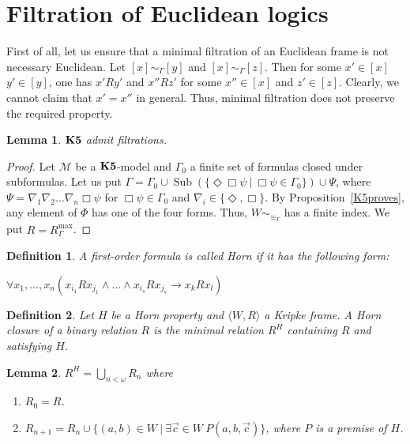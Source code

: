 \documentclass[a4paper]{article}
\theoremstyle{defin}
\newtheorem{defin}{Definition}
\theoremstyle{theorem}
\theoremstyle{prop}
\theoremstyle{lemma}
\newtheorem{lemma}{Lemma}
\theoremstyle{fact}
\theoremstyle{ex}
\theoremstyle{col}
\begin{document}
\section{Filtration of Euclidean logics}

First of all, let us ensure that a minimal filtration of an Euclidean frame is not necessary Euclidean.
Let $[x] \sim_{\Gamma} [y]$ and $[x] \sim_{\Gamma} [z]$. Then for some $x' \in [x]$ $y' \in [y]$, one has
$x' R y'$ and $x'' R z'$ for some $x'' \in [x]$ and $z' \in [z]$. Clearly, we cannot claim that $x' = x''$ in general. Thus, minimal filtration does not preserve the required property.

\begin{lemma}
  ${\bf K5}$ admit filtrations.
\end{lemma}

\begin{proof}
  Let $\mathcal{M}$ be a ${\bf K5}$-model and $\Gamma_0$ a finite set of formulas closed under subformulas.
  Let us put $\Gamma = \Gamma_0 \cup \operatorname{Sub}(\{ \Diamond \Box \psi \: | \: \Box \psi \in \Gamma_0 \}) \cup \Psi$, where $\Psi = \nabla_1 \nabla_2 \dots \nabla_n \Box \psi$ for $\Box \psi \in \Gamma_0$ and
  $\nabla_i \in \{ \Diamond, \Box \}$. By Proposition~\ref{K5proves}, any element of $\Phi$ has one of the four forms. Thus, $W \sim_{\equiv_{\Gamma}}$ has a finite index.
  We put $\widehat{R} = R^{\operatorname{max}}_{\Gamma}$.
\end{proof}

\begin{defin} A first-order formula is called Horn if it has the following form:

  \begin{center}
    $\forall x_1, \dots, x_n (x_{i_1} R x_{j_1} \land \dots \land x_{i_s} R x_{j_s} \rightarrow x_k R x_l)$
  \end{center}
\end{defin}

\begin{defin}
  Let $H$ be a Horn property and $\langle W, R \rangle$ a Kripke frame. A Horn closure of a binary relation $R$ is the minimal relation $R^{H}$ containing $R$ and satisfying $H$.
\end{defin}

\begin{lemma}
  $R^{H} = \bigcup \limits_{n < \omega} R_n$ where

  \begin{enumerate}
    \item $R_0 = R$.
    \item $R_{n + 1} = R_n \cup \{ (a, b) \in W \: | \: \exists \vec{c} \in W \: P(a, b, \vec{c})\}$, where $P$ is a premise of $H$.
  \end{enumerate}
\end{lemma}
\end{document}
